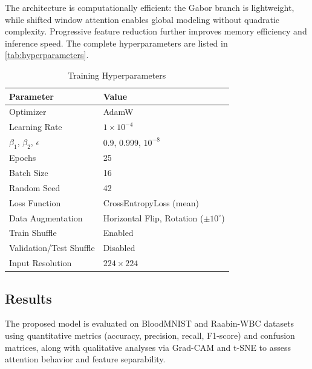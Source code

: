 \documentclass[12pt]{article}
\begin{document}
The architecture is computationally efficient: the Gabor branch is lightweight, while shifted window attention enables global modeling without quadratic complexity. Progressive feature reduction further improves memory efficiency and inference speed. The complete hyperparameters are listed in \autoref{tab:hyperparameters}.

\begin{table}[h]
\centering
\caption{Training Hyperparameters}
\label{tab:hyperparameters}
\footnotesize
\setlength{\tabcolsep}{4pt}
\renewcommand{\arraystretch}{1.1}

\begin{tabular}{|p{3.2cm}|p{4.2cm}|}
\hline
\textbf{Parameter} & \textbf{Value} \\ \hline

Optimizer & AdamW \\ \hline
Learning Rate & $1\times10^{-4}$ \\ \hline
$\beta_1$, $\beta_2$, $\epsilon$ & 0.9, 0.999, $10^{-8}$ \\ \hline

Epochs & 25 \\ \hline
Batch Size & 16 \\ \hline
Random Seed & 42 \\ \hline

Loss Function & CrossEntropyLoss (mean) \\ \hline

Data Augmentation & Horizontal Flip, Rotation ($\pm10^\circ$) \\ \hline
Train Shuffle & Enabled \\ \hline
Validation/Test Shuffle & Disabled \\ \hline

Input Resolution & $224 \times 224$ \\ \hline

\end{tabular}
\end{table}

\FloatBarrier
\subsection{Results}

The proposed model is evaluated on BloodMNIST and Raabin-WBC datasets using quantitative metrics (accuracy, precision, recall, F1-score) and confusion matrices, along with qualitative analyses via Grad-CAM and t-SNE to assess attention behavior and feature separability.
\end{document}
